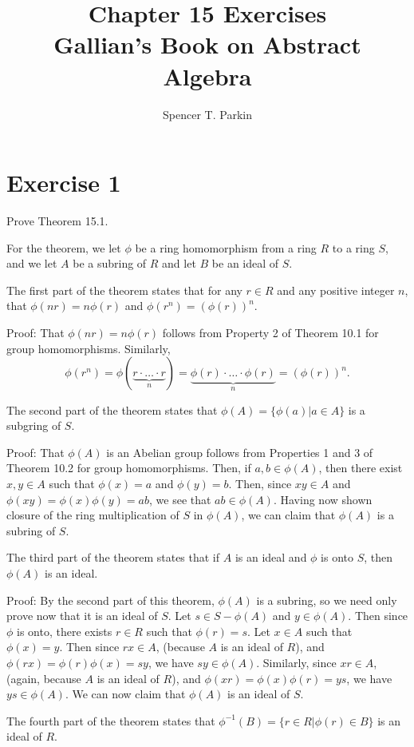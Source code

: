 \documentclass[12pt]{article}
\title{Chapter 15 Exercises\\Gallian's Book on Abstract Algebra}
\author{Spencer T. Parkin}
\begin{document}
\maketitle

\section*{Exercise 1}

Prove Theorem 15.1.

For the theorem, we let $\phi$ be a ring homomorphism from a ring $R$ to a ring $S$,
and we let $A$ be a subring of $R$ and let $B$ be an ideal of $S$.

The first part of the theorem states that for any $r\in R$ and any positive integer $n$,
that $\phi(nr)=n\phi(r)$ and $\phi(r^n)=(\phi(r))^n$.

Proof: That $\phi(nr)=n\phi(r)$ follows from Property 2 of Theorem 10.1 for group homomorphisms.
Similarly,
\begin{equation*}
\phi(r^n)=\phi(\underbrace{r\cdot\dots\cdot r}_n)=\underbrace{\phi(r)\cdot\dots\cdot\phi(r)}_n=(\phi(r))^n.
\end{equation*}

The second part of the theorem states that $\phi(A)=\{\phi(a)|a\in A\}$ is a subgring of $S$.

Proof: That $\phi(A)$ is an Abelian group follows from Properties 1 and 3 of Theorem 10.2
for group homomorphisms.  Then, if $a,b\in\phi(A)$, then there exist $x,y\in A$ such
that $\phi(x)=a$ and $\phi(y)=b$.  Then, since $xy\in A$ and $\phi(xy)=\phi(x)\phi(y)=ab$,
we see that $ab\in\phi(A)$.  Having now shown closure of the ring multiplication of $S$
in $\phi(A)$, we can claim that $\phi(A)$ is a subring of $S$.

The third part of the theorem states that if $A$ is an ideal and $\phi$ is onto $S$,
then $\phi(A)$ is an ideal.

Proof: By the second part of this theorem, $\phi(A)$ is a subring, so we need
only prove now that it is an ideal of $S$.  Let $s\in S-\phi(A)$ and $y\in\phi(A)$.  Then since $\phi$ is onto, there
exists $r\in R$ such that $\phi(r)=s$.  Let $x\in A$ such that $\phi(x)=y$.
Then since $rx\in A$, (because $A$ is an ideal of $R$), and $\phi(rx)=\phi(r)\phi(x)=sy$,
we have $sy\in\phi(A)$.  Similarly, since $xr\in A$, (again, because $A$ is an ideal of $R$),
and $\phi(xr)=\phi(x)\phi(r)=ys$, we have $ys\in\phi(A)$.  We can now claim that $\phi(A)$
is an ideal of $S$.

The fourth part of the theorem states that $\phi^{-1}(B)=\{r\in R|\phi(r)\in B\}$ is an ideal of $R$.
\end{document}
